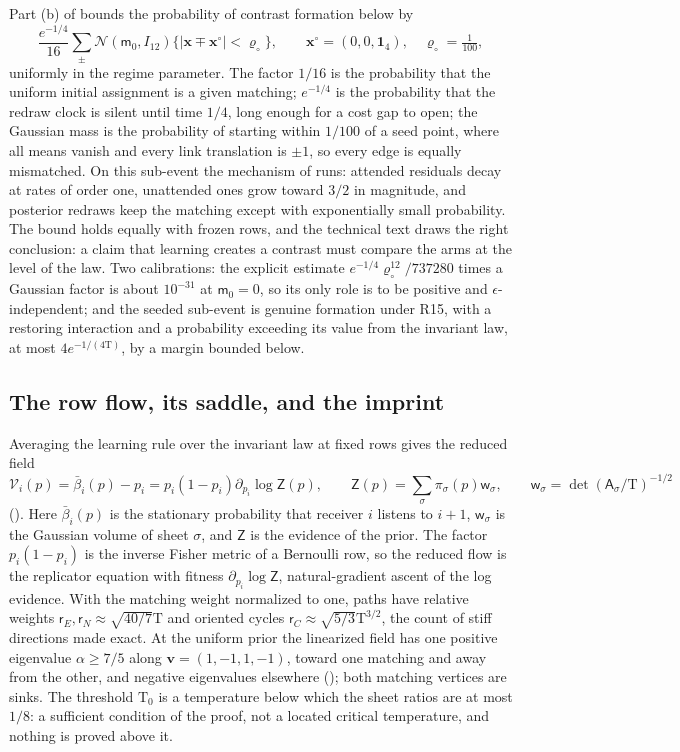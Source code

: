 Part (b) of  bounds the probability of contrast formation below by
\[
\frac{e^{-1/4}}{16}\sum_{\pm}\mathcal N(\mathsf m_0,I_{12})
\bigl\{|\mathbf x\mp\mathbf x^\circ|<\varrho_\circ\bigr\},
\qquad \mathbf x^\circ=(0,0,\mathbf 1_4),\quad \varrho_\circ=\tfrac1{100},
\]
uniformly in the regime parameter. The factor $1/16$ is the probability that the uniform initial
assignment is a given matching; $e^{-1/4}$ is the probability that the redraw clock is silent until time
$1/4$, long enough for a cost gap to open; the Gaussian mass is the probability of starting within $1/100$
of a seed point, where all means vanish and every link translation is $\pm1$, so every edge is equally
mismatched. On this sub-event the mechanism of  runs: attended
residuals decay at rates of order one, unattended ones grow toward $3/2$ in magnitude, and posterior
redraws keep the matching except with exponentially small probability. The bound holds equally with
frozen rows, and the technical text draws the right conclusion: a claim that learning creates a contrast
must compare the arms at the level of the law. Two calibrations: the explicit estimate
$e^{-1/4}\varrho_\circ^{12}/737280$ times a Gaussian factor is about $10^{-31}$ at $\mathsf m_0=0$, so its
only role is to be positive and $\epsilon$-independent; and the seeded sub-event is genuine formation
under R15, with a restoring interaction and a probability exceeding its value from the invariant law, at
most $4e^{-1/(4\mathrm T)}$, by a margin bounded below.

\subsection{The row flow, its saddle, and the imprint}

Averaging the learning rule over the invariant law at fixed rows gives the reduced field
\[
\mathscr V_i(p)=\bar\beta_i(p)-p_i=p_i(1-p_i)\partial_{p_i}\log\mathsf Z(p),
\qquad
\mathsf Z(p)=\sum_\sigma\pi_\sigma(p)\mathsf w_\sigma,
\qquad
\mathsf w_\sigma=\det(\mathsf A_\sigma/\mathrm T)^{-1/2}
\]
(). Here $\bar\beta_i(p)$ is the stationary probability that
receiver $i$ listens to $i+1$, $\mathsf w_\sigma$ is the Gaussian volume of sheet $\sigma$, and
$\mathsf Z$ is the evidence of the prior. The factor $p_i(1-p_i)$ is the inverse Fisher metric of a
Bernoulli row, so the reduced flow is the replicator equation with fitness $\partial_{p_i}\log\mathsf Z$,
natural-gradient ascent of the log evidence. With the matching weight normalized to one, paths have
relative weights $\mathsf r_E,\mathsf r_N\approx\sqrt{40/7}\mathrm T$ and oriented cycles
$\mathsf r_C\approx\sqrt{5/3}\mathrm T^{3/2}$, the count of stiff directions made exact. At the uniform
prior the linearized field has one positive eigenvalue $\alpha\ge7/5$ along $\mathbf v=(1,-1,1,-1)$,
toward one matching and away from the other, and negative eigenvalues elsewhere
(); both matching vertices are sinks. The threshold
$\mathrm T_0$ is a temperature below which the sheet ratios are at most $1/8$: a sufficient condition of
the proof, not a located critical temperature, and nothing is proved above it.

